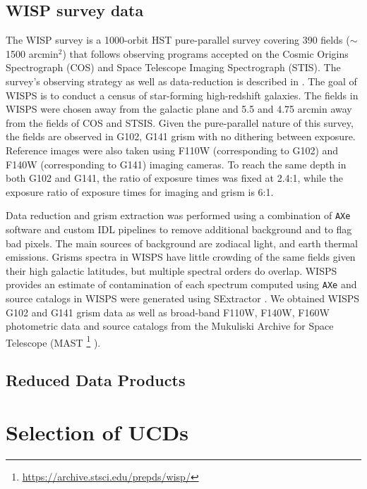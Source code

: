\documentclass[manuscript]{aastex63}
\begin{document}
\subsection{WISP survey data}

The WISP survey is a 1000-orbit HST pure-parallel survey covering 390 fields ($\sim$1500 arcmin$^2$) that follows observing programs accepted on the Cosmic Origins Spectrograph (COS) and Space Telescope Imaging Spectrograph (STIS). The survey's observing strategy as well as data-reduction is described in \cite{2010ApJ...723..104A}. The goal of WISPS is to conduct a census of star-forming high-redshift galaxies. The fields in WISPS were chosen away from the galactic plane and  5.5 and 4.75 arcmin away from the fields of COS and STSIS. Given the pure-parallel nature of this survey, the fields are observed in G102, G141 grism with no dithering between exposure. Reference images were also taken using F110W (corresponding to G102) and F140W (corresponding to G141) imaging cameras. To reach the same depth in both G102 and G141, the ratio of exposure times was fixed at 2.4:1, while the exposure ratio of exposure times for imaging and grism is 6:1.

Data reduction and grism extraction was performed using a combination of \texttt{AXe} software \citep{Kuntschner2013, Kummel2009} and custom IDL pipelines to remove additional background and to flag bad pixels. The main sources of background are zodiacal light, and earth thermal emissions. Grisms spectra in WISPS have little crowding of the same fields given their high galactic latitudes, but multiple spectral orders do overlap. WISPS provides an estimate of contamination of each spectrum computed using \texttt{AXe} and source catalogs in WISPS were generated using SExtractor \citep{1996A&AS..117..393B}. We obtained WISPS G102 and G141 grism data as well as broad-band F110W, F140W, F160W photometric data and source catalogs from the Mukuliski Archive for Space Telescope (MAST \footnote{\url{https://archive.stsci.edu/prepds/wisp/}} ). 


\subsection{Reduced Data Products}

\section{Selection of UCDs}\label{sec:selectionp}
\end{document}
